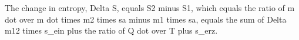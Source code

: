 The change in entropy, Delta S, equals S2 minus S1, which equals the ratio of m dot over m dot times m2 times sa minus m1 times sa, equals the sum of Delta m12 times s_ein plus the ratio of Q dot over T plus s_erz.